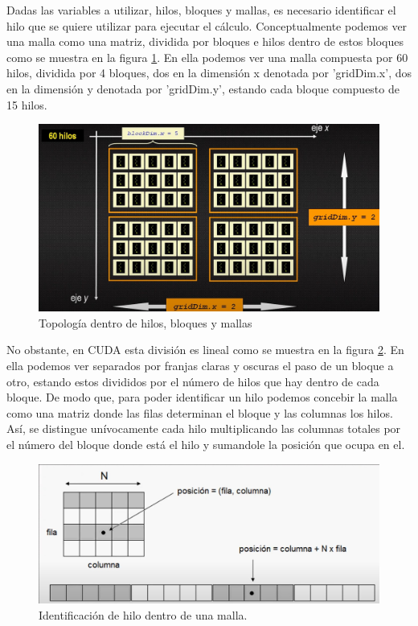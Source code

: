 \documentclass[11pt,a4paper,twoside,pdf]{article}
\numberwithin{equation}{section}
\begin{document}
Dadas las variables a utilizar, hilos, bloques y mallas, es necesario identificar el hilo que se quiere utilizar para ejecutar el cálculo. Conceptualmente podemos ver una malla como una matriz, dividida por bloques e hilos dentro de estos bloques como se muestra en la figura \ref{fig:hilos, bloques y mallas en gpu}. En ella podemos ver una malla compuesta por 60 hilos, dividida por 4 bloques, dos en la dimensión x denotada por 'gridDim.x', dos en la dimensión y denotada por 'gridDim.y', estando cada bloque compuesto de 15 hilos.

\begin{figure}[h]
\centering
\includegraphics[width=10 cm]{Nvidia_Topologia_virtual.jpg}				
\caption{Topología dentro de hilos, bloques y mallas \cite{web} }
\label{fig:hilos, bloques y mallas en gpu}
\end{figure}
\noindent

No obstante, en CUDA esta división es lineal como se muestra en la figura \ref{fig:localizacion de hilos}. En ella podemos ver separados por franjas claras y oscuras el paso de un bloque a otro, estando estos divididos por el número de hilos que hay dentro de cada bloque. De modo que, para poder identificar un hilo podemos concebir la malla como una matriz donde las filas determinan el bloque y las columnas los hilos. Así, se distingue unívocamente cada hilo multiplicando las columnas totales por el número del bloque donde está el hilo y sumandole la posición que ocupa en el.

\begin{figure}[h]
\centering
\includegraphics[width=10 cm]{Nvidia_Posicion_hilo.jpg}				
\caption{Identificación de hilo dentro de una malla.}
\label{fig:localizacion de hilos}
\end{figure}
\noindent
\end{document}

